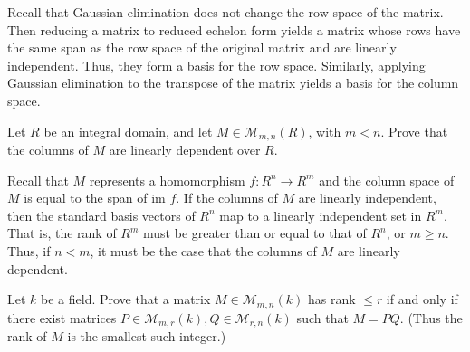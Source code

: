 \documentclass[../../master.tex]{subfiles}
\begin{document}
\begin{solution}
    Recall that Gaussian elimination does not change the row space of the matrix.
    Then reducing a matrix to reduced echelon form yields a matrix whose rows have the same span as the row space of the original matrix and are linearly independent.
    Thus, they form a basis for the row space.
    Similarly, applying Gaussian elimination to the transpose of the matrix yields a basis for the column space.
\end{solution}

\begin{problem}
    Let $R$ be an integral domain, and let $M \in \mathcal{M}_{m,n}(R)$, with $m < n$.
    Prove that the columns of $M$ are linearly dependent over $R$.
\end{problem}

\begin{solution}
    Recall that $M$ represents a homomorphism $f: R^{n} \to R^{m}$ and the column space of $M$ is equal to the span of $\text{im }f$.
    If the columns of $M$ are linearly independent, then the standard basis vectors of $R^{n}$ map to a linearly independent set in $R^{m}$.
    That is, the rank of $R^{m}$ must be greater than or equal to that of $R^{n}$, or $m \geq n$.
    Thus, if $n < m$, it must be the case that the columns of $M$ are linearly dependent.
\end{solution}

\begin{problem}
    Let $k$ be a field.
    Prove that a matrix $M \in \mathcal{M}_{m,n}(k)$ has rank $\leq r$ if and only if there exist matrices $P \in \mathcal{M}_{m,r}(k), Q \in \mathcal{M}_{r,n}(k)$ such that $M = PQ$.
    (Thus the rank of $M$ is the smallest such integer.)
\end{problem}
\end{document}
